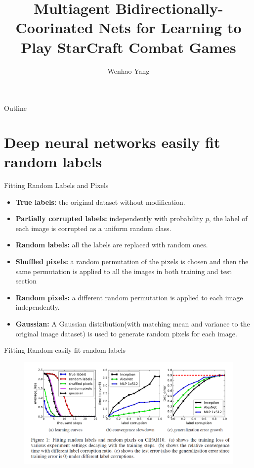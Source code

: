 \documentclass[mathserif]{beamer}
\begin{document}
\title{Multiagent Bidirectionally-Coorinated Nets for Learning to Play StarCraft
Combat Games}

\author{Wenhao Yang
}
\begin{frame}
  \titlepage
\end{frame}

\date{}

\begin{frame}{Outline}
\tableofcontents
\end{frame}

\section{Deep neural networks easily fit random labels}
\begin{frame}[t]{Fitting Random Labels and Pixels}
  \begin{itemize}
  \item \textbf{True labels: }the original dataset without modification.
  \item \textbf{Partially corrupted labels: }independently with probability $p$,
  the label of each image is corrupted as a uniform random class.
  \item \textbf{Random labels: }all the labels are replaced with random ones.
  \item \textbf{Shuffled pixels: }a random permutation of the pixels is chosen
  and then the same permutation is applied to all the images in both training
  and test section
  \item \textbf{Random pixels: }a different random permutation is applied to
  each image independently.
  \item \textbf{Gaussian: }A Gaussian distribution(with matching mean and
  variance to the original image dataset) is used to generate random
  pixels for each image.
\end{itemize}
\end{frame}
\begin{frame}[t]{Fitting Random easily fit random labels}
  \begin{figure}
    \centering
    \includegraphics[scale=0.5]{fig/1}
  \end{figure}
\end{frame}
\end{document}
